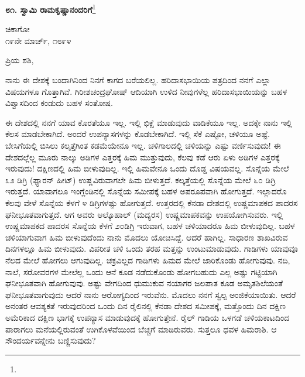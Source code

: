 \begin{center}
\textbf{೮೧. ಸ್ವಾಮಿ ರಾಮಕೃಷ್ಣಾನಂದರಿಗೆ}\footnote{}
\end{center}
\vspace{-0.6cm}

\begin{flushright}
ಚಿಕಾಗೋ\\೧೯ನೇ ಮಾರ್ಚ್, ೧೮೯೪
\end{flushright}
\vspace{-0.6cm}

\noindent
ಪ್ರಿಯ ಶಶಿ,

ನಾನು ಈ ದೇಶಕ್ಕೆ ಬಂದಾಗಿನಿಂದ ನಿನಗೆ ಕಾಗದ ಬರೆಯಲಿಲ್ಲ. ಹರಿದಾಸಭಾಯಿಯ ಪತ್ರದಿಂದ ನನಗೆ ಎಲ್ಲಾ ವಿಷಯಗಳೂ ಗೊತ್ತಾಗಿವೆ. ಗಿರೀಶಚಂದ್ರಘೋಷ್ ಆದಿಯಾಗಿ ಉಳಿದ ನೀವುಗಳೆಲ್ಲ ಹರಿದಾಸಭಾಯಿಯನ್ನು ಬಹಳ ವಿಶ್ವಾಸದಿಂದ ಕಂಡುದು ಬಹಳ ಸಂತೋಷ.

ಈ ದೇಶದಲ್ಲಿ ನನಗೆ ಯಾವ ಕೊರತೆಯೂ ಇಲ್ಲ. ಇಲ್ಲಿ ಭಿಕ್ಷೆ ಮಾಡುವುದು ವಾಡಿಕೆಯೂ ಇಲ್ಲ. ಅದಕ್ಕೇ ನಾನು ಇಲ್ಲಿ ಕೆಲಸ ಮಾಡಬೇಕಾಗಿದೆ. ಅಂದರೆ ಉಪನ್ಯಾಸಗಳನ್ನು ಕೊಡಬೇಕಾಗಿದೆ. ಇಲ್ಲಿ ಸೆಕೆ ಎಷ್ಟೋ, ಚಳಿಯೂ ಅಷ್ಟೆ. ಬೇಸಿಗೆಯಲ್ಲಿ ಬಿಸಿಲು ಕಲ್ಕತ್ತೆಗಿಂತ ಕಡಮೆಯೇನೂ ಇಲ್ಲ. ಚಳಿಗಾಲದಲ್ಲಿ ಚಳಿಯನ್ನು ಎಷ್ಟು ವರ್ಣಿಸುವುದು! ಈ ದೇಶದಲ್ಲೆಲ್ಲ ಮೂರು ನಾಲ್ಕು ಅಡಿಗಳ ಎತ್ತರಕ್ಕೆ ಹಿಮ ಮುತ್ತುವುದು, ಕೆಲವು ಕಡೆ ಆರು ಏಳು ಅಡಿಗಳ ಎತ್ತರಕ್ಕೆ ಇರುವುದು! ದಕ್ಷಿಣದಲ್ಲಿ ಹಿಮ ಬೀಳುವುದಿಲ್ಲ. ಇಲ್ಲಿ ಹಿಮವೇನೂ ಒಂದು ದೊಡ್ಡ ವಿಷಯವಲ್ಲ. ಸೊನ್ನೆಯ ಮೇಲೆ ೩೨ ಡಿಗ್ರಿ (ಫ್ಯಾರನ್ ಹೀಟ್) ಉಷ್ಣವಿರುವಾಗಲೇ ಹಿಮ ಬೀಳುತ್ತದೆ. ಕಲ್ಕತ್ತೆಯಲ್ಲಿ ಸೊನ್ನೆಯ ಮೇಲೆ ೬೦ ಡಿಗ್ರಿ ಇರುತ್ತದೆ. ಯಾವಾಗಲೂ ಇಂಗ್ಲೆಂಡಿನಲ್ಲಿ ಸೊನ್ನೆಯ ಸಮೀಪಕ್ಕೆ ಬಹಳ ಅಪರೂಪವಾಗಿ ಹೋಗುತ್ತದೆ. ಇಲ್ಲಾದರೊ ಕೆಲವು ವೇಳೆ ಸೊನ್ನೆಯ ಕೆಳಗೆ ೪ ಡಿಗ್ರಿಗಳಷ್ಟು ಹೋಗುತ್ತದೆ. ಉತ್ತರದಲ್ಲಿ ಕೆನಡಾ ದೇಶದಲ್ಲಿ ಉಷ್ಣಮಾಪಕದ ಪಾದರಸ ಘನೀಭೂತವಾಗುತ್ತದೆ. ಆಗ ಅವರು ಆಲ್ಕೊಹಾಲ್ (ಮದ್ಯರಸ) ಉಷ್ಣಮಾಪಕವನ್ನು ಉಪಯೋಗಿಸುವರು. ಇಲ್ಲಿ ಉಷ್ಣಮಾಪಕದ ಪಾದರಸ ಸೊನ್ನೆಯ ಕೆಳಗೆ ೨೦ಡಿಗ್ರಿ ಇರುವಾಗ, ಬಹಳ ಚಳಿಯಾದರೂ ಹಿಮ ಬೀಳುವುದಿಲ್ಲ. ಬಹಳ ಚಳಿಯಾಗುವಾಗ ಹಿಮ ಬೀಳುವುದೆಂದು ನಾನು ಮೊದಲು ಯೋಚಿಸಿದ್ದೆ. ಆದರೆ ಹಾಗಿಲ್ಲ. ಸಾಧಾರಣ ಶಾಖವಿರುವ ದಿನಗಳಲ್ಲೂ ಹಿಮ ಬೀಳುವುದು. ವಿಪರೀತ ಚಳಿ ಒಂದು ತರಹ ಮತ್ತನ್ನು ಉಂಟುಮಾಡುವುದು. ಗಾಡಿಗಳು ಯಾವುವೂ ನೆಲದ ಮೇಲೆ ಹೋಗಲು ಆಗುವುದಿಲ್ಲ. ಚಕ್ರವಿಲ್ಲದ ಗಾಡಿಗಳು ಹಿಮದ ಮೇಲೆ ಜಾರಿಕೊಂಡು ಹೋಗುವುವು. ನದಿ, ನಾಲೆ, ಸರೋವರಗಳ ಮೇಲೆಲ್ಲ ಒಂದು ಆನೆ ಕೂಡ ನಡೆದುಕೊಂಡು ಹೋಗಬಹುದು \enginline{-} ಎಲ್ಲ ಅಷ್ಟು ಗಟ್ಟಿಯಾಗಿ ಘನೀಭೂತವಾಗಿ ಹೋಗುವುವು. ಅಷ್ಟು ವೇಗದಿಂದ ಧುಮುಕುವ ನಯಾಗರ ಜಲಪಾತ ಕೂಡ ಅಮೃತಶಿಲೆಯಂತೆ ಘನೀಭೂತವಾಗುವುದು ಆದರೆ ನಾನು ಆರೋಗ್ಯದಿಂದ ಇರುವೆನು. ಮೊದಲು ನನಗೆ ಸ್ವಲ್ಪ ಅಂಜಿಕೆಯಾಯಿತು. ಆದರೆ ಅನಂತರ ಆವಶ್ಯಕತೆ ಇರುವುದರಿಂದ ಒಂದು ದಿನ ರೈಲಿನಲ್ಲಿ ಕೆನಡಾ ದೇಶದ ಸಮೀಪಕ್ಕೆ, ಮತ್ತೊಂದು ದಿನ ದಕ್ಷಿಣ ಅಮೆರಿಕಾದ ದಕ್ಷಿಣ ಭಾಗಕ್ಕೆ ಉಪನ್ಯಾಸ ಮಾಡುವುದಕ್ಕೆ ಹೋಗುತ್ತೇನೆ. ರೈಲ್ ಗಾಡಿಯ ಒಳಗಡೆ ಚಳಿಯಕಾಟದಿಂದ ಪಾರಾಗಲು ಮನೆಯಲ್ಲಿರುವಂತೆ ಉಗಿಕೊಳವೆಯಿಂದ ಬೆಚ್ಚಗೆ ಮಾಡಿರುವರು. ಸುತ್ತಲೂ ಧವಳ ಹಿಮರಾಶಿ. ಆ ಸೌಂದರ್ಯವನ್ನೇನು ಬಣ್ಣಿಸುವುದು?

